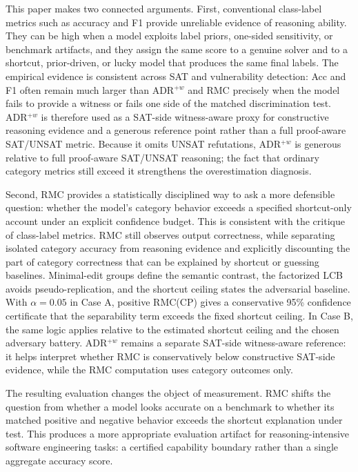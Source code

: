\documentclass[conference]{IEEEtran}
\theoremstyle{remark}
\begin{document}
This paper makes two connected arguments.  First, conventional class-label metrics such as accuracy and F1 provide unreliable evidence of reasoning ability.  They can be high when a model exploits label priors, one-sided sensitivity, or benchmark artifacts, and they assign the same score to a genuine solver and to a shortcut, prior-driven, or lucky model that produces the same final labels.  The empirical evidence is consistent across SAT and vulnerability detection: Acc and F1 often remain much larger than ADR$^{+w}$ and RMC precisely when the model fails to provide a witness or fails one side of the matched discrimination test.  ADR$^{+w}$ is therefore used as a SAT-side witness-aware proxy for constructive reasoning evidence and a generous reference point rather than a full proof-aware SAT/UNSAT metric.  Because it omits UNSAT refutations, ADR$^{+w}$ is generous relative to full proof-aware SAT/UNSAT reasoning; the fact that ordinary category metrics still exceed it strengthens the overestimation diagnosis.

Second, RMC provides a statistically disciplined way to ask a more defensible question: whether the model's category behavior exceeds a specified shortcut-only account under an explicit confidence budget.  This is consistent with the critique of class-label metrics.  RMC still observes output correctness, while separating isolated category accuracy from reasoning evidence and explicitly discounting the part of category correctness that can be explained by shortcut or guessing baselines.  Minimal-edit groups define the semantic contrast, the factorized LCB avoids pseudo-replication, and the shortcut ceiling states the adversarial baseline.  With $\alpha=0.05$ in Case A, positive RMC(CP) gives a conservative 95\% confidence certificate that the separability term exceeds the fixed shortcut ceiling.  In Case B, the same logic applies relative to the estimated shortcut ceiling and the chosen adversary battery.  ADR$^{+w}$ remains a separate SAT-side witness-aware reference: it helps interpret whether RMC is conservatively below constructive SAT-side evidence, while the RMC computation uses category outcomes only.

The resulting evaluation changes the object of measurement.  RMC shifts the question from whether a model looks accurate on a benchmark to whether its matched positive and negative behavior exceeds the shortcut explanation under test.  This produces a more appropriate evaluation artifact for reasoning-intensive software engineering tasks: a certified capability boundary rather than a single aggregate accuracy score.
\end{document}
